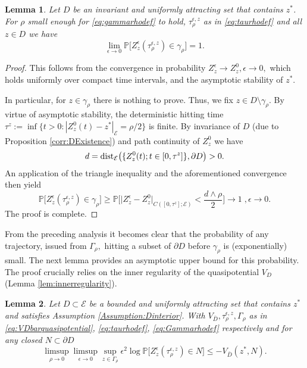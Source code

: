 \documentclass[10pt, reqno]{amsart}
\newcommand{\pr}{\mathbb{P}}
\newcommand{\e}{\mathcal{E}}
\newtheorem{lem}{Lemma}
\theoremstyle{definition}
\numberwithin{lem}{section}
\numberwithin{cor}{section}
\numberwithin{prop}{section}
\numberwithin{thm}{section}
\numberwithin{dfn}{section}
\begin{document}
\begin{lem}\label{lem:smallballlimit} Let $D$ be an invariant and uniformly attracting set that contains $z^*$. For $\rho$ small enough for \eqref{eq:gammarhodef} to hold, $\tau^{\epsilon,z}_\rho$ as in \eqref{eq:taurhodef} and all $z\in D$ we have
\begin{equation*}
      \lim_{\epsilon\to 0} \pr\bigg[ Z^{\epsilon}_z(\tau_{\rho}^{\epsilon, z}  )\in\gamma_\rho \bigg]=1. 
\end{equation*}  
\end{lem}
\begin{proof} This follows from the convergence in probability  $Z^{\epsilon}_z\rightarrow Z_z^0, \epsilon\to 0,$ which holds uniformly over compact time intervals, and the asymptotic stability of $z^*.$

In particular, for $z\in\gamma_\rho$ there is nothing to prove. Thus, we fix $z\in D\setminus\gamma_\rho.$ By virtue of asymptotic stability, the deterministic hitting time $\tau^z:=\inf\{ t>0 : |Z^0_z(t)-z^*|_\e=\rho/2  \}$
is finite. By invariance of $D$ (due to Proposition \ref{corr:DExistence}) and path continuity of $Z_z^0$ we have $$d=\textnormal{dist}_{\e}\big(\{Z_z^0(t); t\in[0,\tau^z]\}, \partial D    \big)>0.        $$
An application of the triangle inequality and the aforementioned convergence then yield
$$\pr\bigg[ Z^{\epsilon}_z(\tau_{\rho}^{\epsilon, z}  )\in\gamma_\rho \bigg]\geq \pr\bigg[ \big|Z^\epsilon_z-Z^0_z\big|_{C([0,\tau^z];\e)}  <\frac{d\wedge\rho}{2} \bigg]\longrightarrow 1\;,\epsilon\to 0.    $$
The proof is complete.
\end{proof}
\noindent From the preceding analysis it becomes clear that the probability of any trajectory, issued from $\Gamma_\rho,$ hitting a subset of $\partial D$ before $\gamma_\rho$ is (exponentially) small.
The next lemma provides an asymptotic upper bound for this probability. The proof crucially relies on the inner regularity of the quasipotential $V_D$ (Lemma \ref{lem:innerregularity}).
\begin{lem}\label{lem:rhoupperbound}
    Let $D\subset\e$ be a bounded and uniformly attracting set that contains $z^*$ and satisfies Assumption \ref{Assumption:Dinterior}. With  $V_{\bar{D}}, \tau^{\epsilon,z}_\rho, \Gamma_\rho $ as in \eqref{eq:VDbarquasipotential}, \eqref{eq:taurhodef}, \eqref{eq:Gammarhodef} respectively and for any closed $N \subset \partial D$
    \begin{equation*}
        \limsup_{\rho \to 0} \limsup_{\epsilon \to 0} \sup_{z \in \Gamma_\rho} \epsilon^2 \log \pr\bigg[ Z^\epsilon_z(\tau^{\epsilon,z}_\rho) \in N\bigg] \leq - V_{\bar{D}}(z^*,N).
    \end{equation*}
\end{lem}
\end{document}
